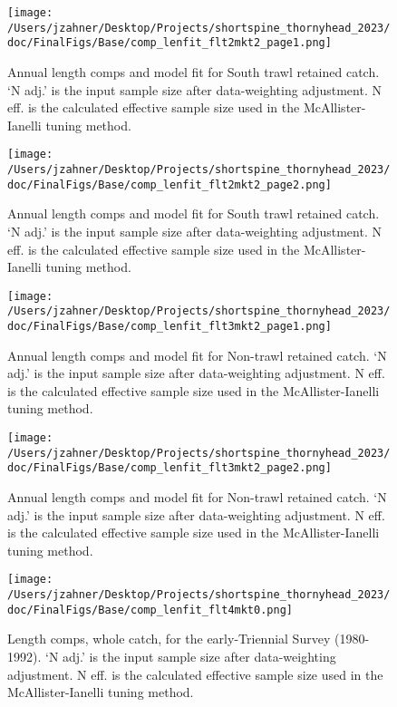 \documentclass[11pt,
  english,
  letterpaper,
]{article}
\begin{document}
\begin{figure}
\centering
\texttt{[image: /Users/jzahner/Desktop/Projects/shortspine\_thornyhead\_2023/doc/FinalFigs/Base/comp\_lenfit\_flt2mkt2\_page1.png]}
\caption{Annual length comps and model fit for South trawl retained catch. `N adj.' is the input sample size after data-weighting adjustment. N eff. is the calculated effective sample size used in the McAllister-Ianelli tuning method.\label{fig:strawl_comps_1}}
\end{figure}

\begin{figure}
\centering
\texttt{[image: /Users/jzahner/Desktop/Projects/shortspine\_thornyhead\_2023/doc/FinalFigs/Base/comp\_lenfit\_flt2mkt2\_page2.png]}
\caption{Annual length comps and model fit for South trawl retained catch. `N adj.' is the input sample size after data-weighting adjustment. N eff. is the calculated effective sample size used in the McAllister-Ianelli tuning method.\label{fig:strawl_comps_2}}
\end{figure}

\begin{figure}
\centering
\texttt{[image: /Users/jzahner/Desktop/Projects/shortspine\_thornyhead\_2023/doc/FinalFigs/Base/comp\_lenfit\_flt3mkt2\_page1.png]}
\caption{Annual length comps and model fit for Non-trawl retained catch. `N adj.' is the input sample size after data-weighting adjustment. N eff. is the calculated effective sample size used in the McAllister-Ianelli tuning method.\label{fig:nontrawl_comps_1}}
\end{figure}

\begin{figure}
\centering
\texttt{[image: /Users/jzahner/Desktop/Projects/shortspine\_thornyhead\_2023/doc/FinalFigs/Base/comp\_lenfit\_flt3mkt2\_page2.png]}
\caption{Annual length comps and model fit for Non-trawl retained catch. `N adj.' is the input sample size after data-weighting adjustment. N eff. is the calculated effective sample size used in the McAllister-Ianelli tuning method.\label{fig:nontrawl_comps_2}}
\end{figure}

\begin{figure}
\centering
\texttt{[image: /Users/jzahner/Desktop/Projects/shortspine\_thornyhead\_2023/doc/FinalFigs/Base/comp\_lenfit\_flt4mkt0.png]}
\caption{Length comps, whole catch, for the early-Triennial Survey (1980-1992). `N adj.' is the input sample size after data-weighting adjustment. N eff. is the calculated effective sample size used in the McAllister-Ianelli tuning method.\label{fig:fits_etri}}
\end{figure}
\end{document}
